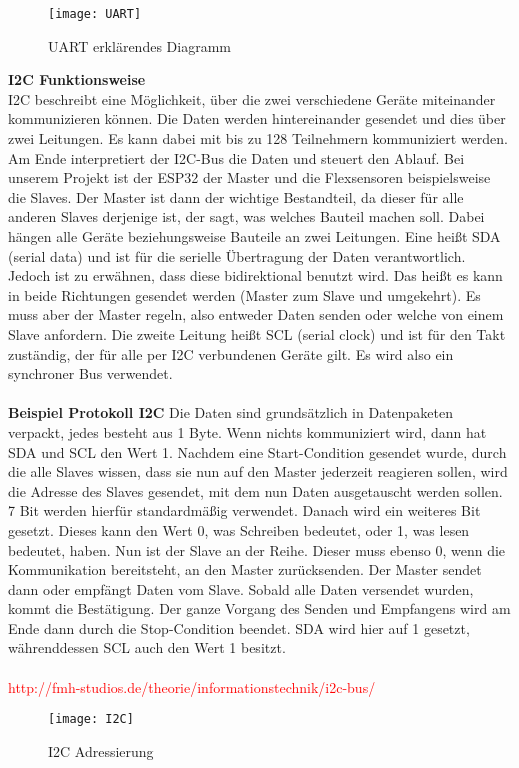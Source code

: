 \documentclass[titlepage,12pt,twoside]{article}
\begin{document}
\begin{figure}[H]
	\begin{center}
		\scalebox{1.0}
		{\texttt{[image: UART]}}
		\caption{UART erklärendes Diagramm}
		\label{fig:UART}		
	\end{center}
\end{figure}
\hfill \break
\textbf{I2C Funktionsweise}
\\
I2C beschreibt eine Möglichkeit, über die zwei verschiedene Geräte miteinander 
kommunizieren können. Die Daten werden hintereinander gesendet und dies über zwei 
Leitungen. Es kann dabei mit bis zu 128 Teilnehmern kommuniziert werden. Am Ende 
interpretiert der I2C-Bus die Daten und steuert den Ablauf. Bei unserem Projekt ist 
der ESP32 der Master und die Flexsensoren beispielsweise die Slaves. Der Master ist 
dann der wichtige Bestandteil, da dieser für alle anderen Slaves derjenige ist, der 
sagt, was welches Bauteil machen soll. Dabei hängen alle Geräte beziehungsweise 
Bauteile an zwei Leitungen. Eine heißt SDA (serial data) und ist für die serielle 
Übertragung der Daten verantwortlich. Jedoch ist zu erwähnen, dass diese bidirektional 
benutzt wird. Das heißt es kann in beide Richtungen gesendet werden (Master zum 
Slave und umgekehrt). Es muss aber der Master regeln, also entweder Daten senden 
oder welche von einem Slave anfordern. Die zweite Leitung heißt SCL (serial clock) 
und ist für den Takt zuständig, der für alle per I2C verbundenen Geräte gilt. Es 
wird also ein synchroner Bus verwendet. \\
\\
\textbf{Beispiel Protokoll I2C}
Die Daten sind grundsätzlich in Datenpaketen verpackt, jedes besteht aus 1 Byte. 
Wenn nichts kommuniziert wird, dann hat SDA und SCL den Wert 1. Nachdem eine 
Start-Condition gesendet wurde, durch die alle Slaves wissen, dass sie nun auf den 
Master jederzeit reagieren sollen, wird die Adresse des Slaves gesendet, mit dem 
nun Daten ausgetauscht werden sollen. 7 Bit werden hierfür standardmäßig verwendet. 
Danach wird ein weiteres Bit gesetzt. Dieses kann den Wert 0, was Schreiben bedeutet, 
oder 1, was lesen bedeutet, haben. Nun ist der Slave an der Reihe. Dieser muss 
ebenso 0, wenn die Kommunikation bereitsteht, an den Master zurücksenden. Der Master 
sendet dann oder empfängt Daten vom Slave. Sobald alle Daten versendet wurden, 
kommt die Bestätigung. Der ganze Vorgang des Senden und Empfangens wird am Ende 
dann durch die Stop-Condition beendet. SDA wird hier auf 1 gesetzt, währenddessen 
SCL auch den Wert 1 besitzt. \\
\\
\textcolor{red}{http://fmh-studios.de/theorie/informationstechnik/i2c-bus/}
\\
\begin{figure}[H]
	\begin{center}
		\scalebox{1.2}
		{\texttt{[image: I2C]}}
		\caption{I2C Adressierung}
		\label{fig:I2C}		
	\end{center}
\end{figure}
\hfill \break
\end{document}
